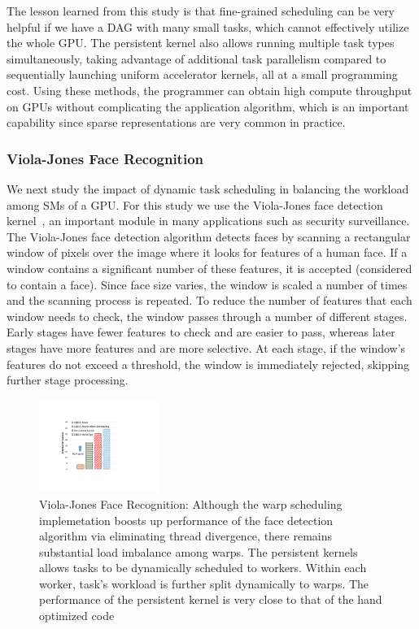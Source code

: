 The lesson learned from this study is that fine-grained scheduling can be very helpful if we have a DAG with many small tasks, which cannot effectively utilize the whole GPU.
The persistent kernel also allows running multiple task types simultaneously, taking advantage of additional task parallelism compared to sequentially launching uniform accelerator kernels, all at a small programming cost.
Using these methods, the programmer can obtain high compute throughput on GPUs without complicating the application algorithm, which is an important capability since sparse representations are very common in practice.

\subsubsection{Viola-Jones Face Recognition}
We next study the impact of dynamic task scheduling in balancing the workload among SMs of a GPU.
For this study we use the Viola-Jones face detection kernel~\cite{facedetection1, facedetection2}, an important module in many applications such as security surveillance.
The Viola-Jones face detection algorithm detects faces by scanning a rectangular window of pixels over the image where it looks for features of a human face. 
If a window contains a significant number of these features, it is accepted (considered to contain a face).
Since face size varies, the window is scaled a number of times and the scanning process is repeated. 
To reduce the number of features that each window needs to check, the window passes through a number of different stages. 
Early stages have fewer features to check and are easier to pass, whereas later stages have more features and are more selective. 
At each stage, if the window's features do not exceed a threshold, the window is immediately rejected, skipping further stage processing.


\begin{figure}[htb]
\centering
\includegraphics[width=0.35\textwidth]{figures/faceRecognition.pdf}
\caption{Viola-Jones Face Recognition: Although the warp scheduling implemetation boosts up performance of the face detection algorithm via eliminating thread divergence, there remains substantial load imbalance among warps. The persistent kernels allows tasks to be dynamically scheduled to workers. Within each worker, task's workload is further split dynamically to warps. The performance of the persistent kernel is very close to that of the hand optimized code}
\label{faceRecognition}
\end{figure}




